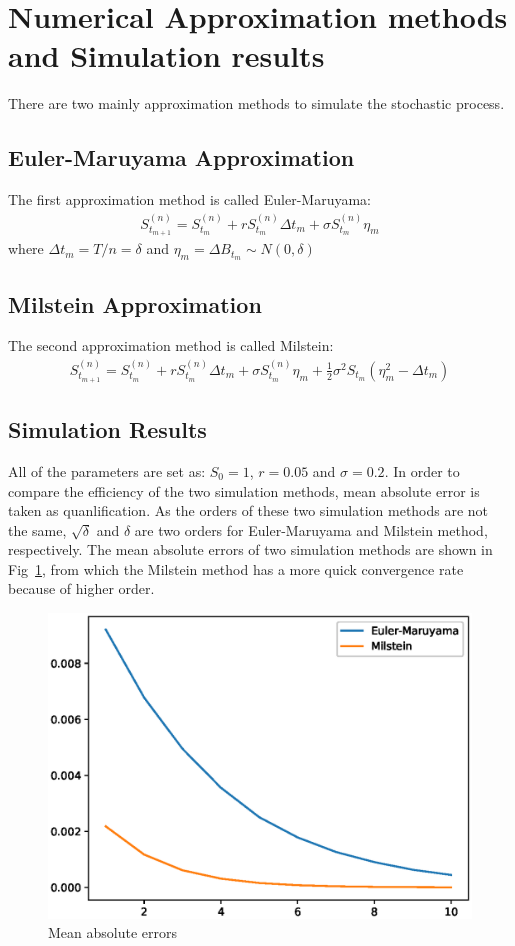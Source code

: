 \documentclass{article} %
\begin{document}
\section{Numerical Approximation methods and Simulation results}
There are two mainly approximation methods to simulate the stochastic process.
\subsection{Euler-Maruyama Approximation}
The first approximation method is called Euler-Maruyama:
\begin{align}
  S_{t_{m+1}}^{(n)}=S_{t_{m}}^{(n)}+rS_{t_{m}}^{(n)}\Delta t_{m}+\sigma S_{t_{m}}^{(n)}\eta_{m}
\end{align}
where $\Delta t_{m}=T/n=\delta$ and $\eta_{m}=\Delta B_{t_{m}}\sim N(0,\delta)$

\subsection{Milstein Approximation}
The second approximation method is called Milstein:
\begin{align}
  S_{t_{m+1}}^{(n)}=S_{t_{m}}^{(n)}+rS_{t_{m}}^{(n)}\Delta t_{m}+\sigma S_{t_{m}}^{(n)}\eta_{m}+\frac{1}{2}\sigma^{2}S_{t_{m}}(\eta_{m}^{2}-\Delta t_{m})
\end{align}

\subsection{Simulation Results}
All of the parameters are set as: $S_{0}=1$, $r=0.05$ and $\sigma=0.2$. In order to compare the efficiency of the two simulation methods, mean absolute error is taken as quanlification. As the orders of these two simulation methods are not the same, $\sqrt{\delta}$ and $\delta$ are two orders for Euler-Maruyama and Milstein method, respectively.  The mean absolute errors of two simulation methods are shown in Fig~\ref{fig:1}, from which the Milstein method has a more quick convergence rate because of higher order.
\begin{figure}[htbp!]
  \centering
  \includegraphics[width=\textwidth]{mc-strong.eps}
  \caption{Mean absolute errors}
  \label{fig:1}
\end{figure}
\end{document}

